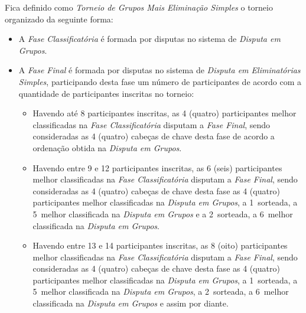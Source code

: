 \noindent
Fica definido como \textit{Torneio de Grupos Mais Eliminação Simples} o torneio organizado da seguinte forma:
\begin{itemize}[noitemsep]
	\item A \textit{Fase Classificatória} é formada por disputas no sistema de \textit{Disputa em Grupos}.

	\item A \textit{Fase Final} é formada por disputas no sistema de \textit{Disputa em Eliminatórias Simples}, participando desta fase um número de participantes de acordo com a quantidade de participantes inscritas no torneio:
	\begin{itemize}[noitemsep]
		\item Havendo até 8 participantes inscritas, as 4 (quatro) participantes melhor classificadas na \textit{Fase Classificatória} disputam a \textit{Fase Final}, sendo consideradas as 4 (quatro) cabeças de chave desta fase de acordo a ordenação obtida na \textit{Disputa em Grupos}.
		\item Havendo entre 9 e 12 participantes inscritas, as 6 (seis) participantes melhor classificadas na \textit{Fase Classificatória} disputam a \textit{Fase Final}, sendo consideradas as 4 (quatro) cabeças de chave desta fase as 4 (quatro) participantes melhor classificadas na \textit{Disputa em Grupos}, a 1\ula\ sorteada, a 5\ula\ melhor classificada na \textit{Disputa em Grupos} e a 2\ula\ sorteada, a 6\ula\ melhor classificada na \textit{Disputa em Grupos}.
		\item Havendo entre 13 e 14 participantes inscritas, as 8 (oito) participantes melhor classificadas na \textit{Fase Classificatória} disputam a \textit{Fase Final}, sendo consideradas as 4 (quatro) cabeças de chave desta fase as 4 (quatro) participantes melhor classificadas na \textit{Disputa em Grupos}, a 1\ula\ sorteada, a 5\ula\ melhor classificada na \textit{Disputa em Grupos}, a 2\ula\ sorteada, a 6\ula\ melhor classificada na \textit{Disputa em Grupos} e assim por diante.
	\end{itemize}


\end{itemize}
